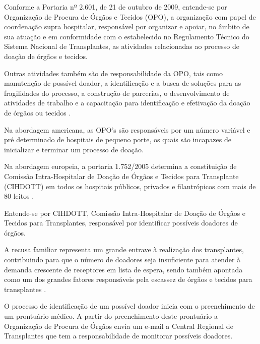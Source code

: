 \documentclass[portuguese,oneside]{tcc}
\begin{document}
Conforme a Portaria nº 2.601, de 21 de outubro de 2009, entende-se por Organização de Procura de Órgãos e Tecidos (OPO), a organização com papel de coordenação supra hospitalar, responsável por organizar e apoiar, no âmbito de sua atuação e em conformidade com o estabelecido no Regulamento Técnico do Sistema Nacional de Transplantes, as atividades relacionadas ao processo de doação de órgãos e tecidos.

Outras atividades também são de responsabilidade da OPO, tais como manutenção de possível doador, a identificação e a busca de soluções para as fragilidades do processo, a construção de parcerias, o desenvolvimento de atividades de trabalho e a capacitação para identificação e efetivação da doação de órgãos ou tecidos \cite{PORTALDASAUDEOPO}. 

Na abordagem americana, as OPO's são responsáveis por um número variável e pré determinado de hospitais de pequeno porte, os quais são incapazes de inicializar e terminar um processo de doação. %

Na abordagem europeia, a portaria 1.752/2005 determina a constituição de Comissão Intra-Hospitalar de Doação de Órgãos e Tecidos para Transplante (CIHDOTT) em todos os hospitais públicos, privados e filantrópicos com mais de 80 leitos \cite{PORTALDASAUDEOPO}. 


Entende-se por CIHDOTT, Comissão Intra-Hospitalar de Doação de Órgãos e Tecidos para Transplantes, responsável por identificar possíveis doadores de órgãos.

A recusa familiar representa um grande entrave à realização dos transplantes, contribuindo para que o número de doadores seja insuficiente para atender à demanda crescente de receptores em lista de espera, sendo também apontada como um dos grandes fatores responsáveis pela escassez de órgãos e tecidos para transplantes \cite{EPRECISOEDUCAR}.


O processo de identificação de um possível doador inicia com o preenchimento de um prontuário médico. A partir do preenchimento deste prontuário a Organização de Procura de Órgãos envia um e-mail a Central Regional de Transplantes que tem a responsabilidade de monitorar possíveis doadores.
\end{document}
